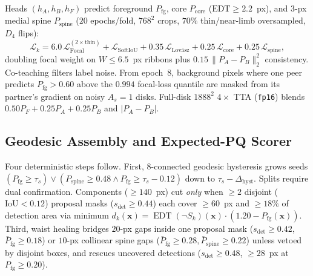 \documentclass[sigconf]{acmart}
\begin{document}
    Heads $(h_A, h_B, h_F)$ predict foreground $P_{\text{fg}}$, core $P_{\text{core}}$ ($\text{EDT} \ge 2.2$~px), and $3$-px medial spine $P_{\text{spine}}$ ($20$ epochs/fold, $768^2$ crops, $70\%$ thin/\allowbreak near-limb oversampled, $D_4$ flips):
\begin{equation}\label{eq:coop_loss}
    \mathcal{L}_k = 6.0\,\mathcal{L}_{\text{Focal}}^{(2\times\text{thin})} + \mathcal{L}_{\text{SoftIoU}} + 0.35\,\mathcal{L}_{\text{Lov\'{a}sz}} + 0.25\,\mathcal{L}_{\text{core}} + 0.25\,\mathcal{L}_{\text{spine}},
\end{equation}
    doubling focal weight on $W \le 6.5$~px ribbons \cite{lin2017focal,berman2018lovasz} plus $0.15\,\|P_A - P_B\|_2^2$ consistency. Co-teaching filters label noise. From epoch~8, background pixels where one peer predicts $P_{\text{fg}} > 0.60$ above the $0.994$ focal-loss quantile are masked from its partner's gradient on noisy $A_s = 1$ disks. Full-disk $1888^2$ $4\times$ TTA (\texttt{fp16}) blends $0.50 P_F + 0.25 P_A + 0.25 P_B$ and $|P_A - P_B|$.

\subsection{Geodesic Assembly and Expected-PQ Scorer}
    Four deterministic steps follow. First, $8$-connected geodesic hysteresis grows seeds $(P_{\text{fg}} \ge \tau_s) \lor (P_{\text{spine}} \ge 0.48 \land P_{\text{fg}} \ge \tau_s - 0.12)$ down to $\tau_s - \Delta_{\text{hyst}}$. Splits require dual confirmation. Components ($\ge 140$~px) cut \emph{only} when $\ge 2$ disjoint ($\text{IoU} < 0.12$) proposal masks ($s_{\text{det}} \ge 0.44$) each cover $\ge 60$~px and $\ge 18\%$ of detection area via minimum $d_k(\mathbf{x}) = \operatorname{EDT}(\neg S_k)(\mathbf{x}) \cdot (1.20 - P_{\text{fg}}(\mathbf{x}))$. Third, waist healing bridges $20$-px gaps inside one proposal mask ($s_{\text{det}} \ge 0.42$, $\bar{P}_{\text{fg}} \ge 0.18$) or $10$-px collinear spine gaps ($\bar{P}_{\text{fg}} \ge 0.28, \bar{P}_{\text{spine}} \ge 0.22$) unless vetoed by disjoint boxes, and rescues uncovered detections ($s_{\text{det}} \ge 0.48$, $\ge 28$~px at $P_{\text{fg}} \ge 0.20$).
\end{document}
